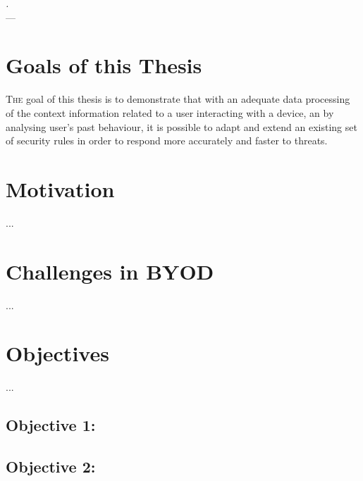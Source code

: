 \label{chap:introduction}
\begin{flushright}{\slshape
    .} \\ \medskip
    --- {}
\end{flushright}
\minitoc\mtcskip
\vfill



\section{Goals of this Thesis} %

\lettrine{T}{he} goal of this thesis is to demonstrate that with an adequate data processing of the context information related to a user interacting with a device, an by analysing user's past behaviour, it is possible to adapt and extend an existing set of security rules in order to respond more accurately and faster to threats.

\section{Motivation}
\label{sec:intro:eas}

...

\section{Challenges in BYOD}
\label{sec:intro:challenges}

...

\section{Objectives}                     
\label{sec:intro:motivation}

...

\newcommand{\objectiveparadigm}{}

 \subsection*{Objective 1: \objectiveparadigm}
\label{subsec:intro:obj:problems}

\newcommand{\objectivemethodology}{}

\subsection*{Objective 2: \objectivemethodology} 
\label{subsec:intro:obj:methodology}

